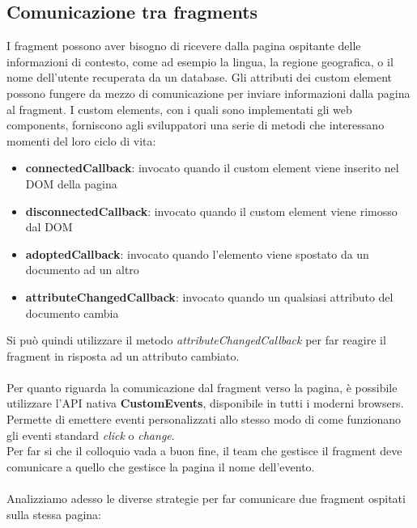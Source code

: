 \subsection{Comunicazione tra fragments}
I fragment possono aver bisogno di ricevere dalla pagina 
ospitante delle informazioni di contesto, come ad esempio la lingua, 
la regione geografica, o il nome dell'utente recuperata da un database.
Gli attributi dei custom element possono fungere da mezzo di comunicazione per inviare
informazioni dalla pagina al fragment.
I custom elements, con i quali sono implementati gli web components, forniscono agli sviluppatori 
una serie di metodi che interessano momenti del loro ciclo di vita:
\begin{itemize}
    \item \textbf{connectedCallback}: invocato quando il custom element viene inserito nel DOM della pagina 
    \item \textbf{disconnectedCallback}: invocato quando il custom element viene rimosso dal DOM
    \item \textbf{adoptedCallback}: invocato quando l'elemento viene spostato da un documento ad un altro
    \item \textbf{attributeChangedCallback}: invocato quando un qualsiasi attributo del documento cambia
\end{itemize}

Si può quindi utilizzare il metodo \emph{attributeChangedCallback} per far reagire il fragment in risposta ad un
attributo cambiato.
\\\\
Per quanto riguarda la comunicazione dal fragment verso la pagina, è possibile utilizzare 
l'API nativa \textbf{CustomEvents}, disponibile in tutti i moderni browsers.
Permette di emettere eventi personalizzati allo stesso modo di come funzionano gli eventi standard \emph{click} o \emph{change}.
\\
Per far si che il colloquio vada a buon fine, il team che gestisce il fragment deve comunicare a quello che gestisce la pagina
il nome dell'evento.
\\\\
Analizziamo adesso le diverse strategie per far comunicare due fragment ospitati sulla stessa pagina:

